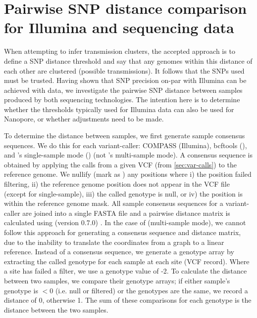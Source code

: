 
\section{Pairwise SNP distance comparison for Illumina and \ont{} sequencing data}
\label{sec:snp-dist}

When attempting to infer transmission clusters, the accepted approach is
to define a SNP distance threshold and say that any genomes within this
distance of each other are clustered (possible transmissions). It follows that the SNPs used must
be trusted. Having shown that SNP precision on-par with Illumina can be
achieved with \ont{} data, we investigate the pairwise SNP distance
between samples produced by both sequencing technologies. The intention
here is to determine whether the thresholds typically used for Illumina
data can also be used for Nanopore, or whether adjustments need to be
made.

To determine the distance between samples, we first generate sample consensus sequences. We do this for each variant-caller: COMPASS (Illumina), bcftools (\ont{}), and \pandora{}'s single-sample mode (\ont{}) (not \pandora{}'s multi-sample mode). A consensus sequence is obtained by applying the calls from a given VCF (from \autoref{sec:var-calls}) to the \mtb{} reference genome. We nullify (mark as ) any positions where i) the position failed filtering, ii) the reference genome position does not appear in the VCF file (except for \pandora{} single-sample), iii) the called genotype is null, or iv) the position is within the reference genome mask. All sample consensus sequences for a variant-caller are joined into a single FASTA file and a pairwise distance matrix is calculated using  (version 0.7.0) \cite{snp-dists}. In the case of \pandora{}  (multi-sample mode), we cannot follow this approach for generating a consensus sequence and distance matrix, due to the inability to translate the coordinates from a graph to a linear reference. Instead of a consensus sequence, we generate a genotype array by extracting the called genotype for each sample at each site (VCF record). Where a site has failed a filter, we use a genotype value of -2. To calculate the distance between two samples, we compare their genotype arrays; if either sample's genotype is $<0$ (i.e. null or filtered) or the genotypes are the same, we record a distance of 0, otherwise 1. The sum of these comparisons for each genotype is the distance between the two samples.

